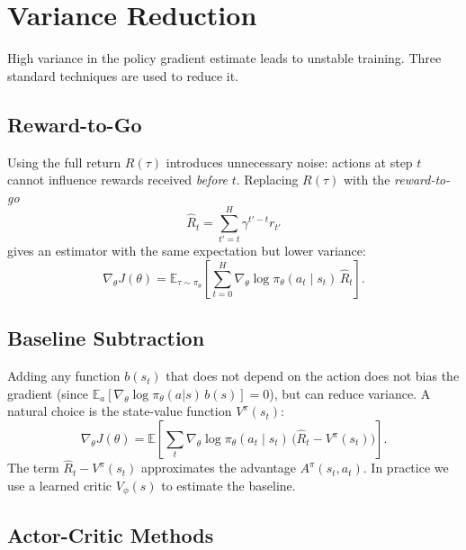 \documentclass[12pt, a4paper]{article}
\theoremstyle{definition}
\theoremstyle{plain}
\theoremstyle{remark}
\newcommand{\E}{\mathbb{E}}
\newcommand{\traj}{\tau}
\newcommand{\pith}{\pi_\theta}
\newcommand{\Rtraj}{R(\traj)}
\newcommand{\Jth}{J(\theta)}
\newcommand{\grad}{\nabla_\theta}
\begin{document}
\section{Variance Reduction}
\label{sec:variance}

High variance in the policy gradient estimate leads to unstable training.  Three
standard techniques are used to reduce it.

\subsection{Reward-to-Go}

Using the full return $R(\tau)$ introduces unnecessary noise: actions at step $t$
cannot influence rewards received \emph{before} $t$.  Replacing $\Rtraj$ with
the \emph{reward-to-go}
\begin{equation}
  \hat{R}_t = \sum_{t'=t}^{H} \gamma^{t'-t} r_{t'}
\end{equation}
gives an estimator with the same expectation but lower variance:
\begin{equation}
  \grad \Jth
    = \E_{\traj \sim \pith}\!\left[
        \sum_{t=0}^{H} \grad \log \pith(a_t \mid s_t)\, \hat{R}_t
      \right].
\end{equation}

\subsection{Baseline Subtraction}

Adding any function $b(s_t)$ that does not depend on the action does not bias the
gradient (since $\E_a[\nabla_\theta \log \pi_\theta(a|s)\, b(s)] = 0$), but can
reduce variance.  A natural choice is the state-value function $V^\pi(s_t)$:
\begin{equation}
  \grad \Jth
    = \E\!\left[
        \sum_{t} \grad \log \pith(a_t \mid s_t)\,
        \bigl(\hat{R}_t - V^\pi(s_t)\bigr)
      \right].
\end{equation}
The term $\hat{R}_t - V^\pi(s_t)$ approximates the advantage $A^\pi(s_t, a_t)$.
In practice we use a learned critic $V_\phi(s)$ to estimate the baseline.

\subsection{Actor-Critic Methods}
\label{sec:actor_critic}
\end{document}
